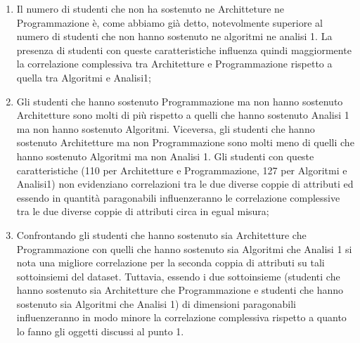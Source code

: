 \documentclass[12pt]{article}
\begin{document}
\begin{enumerate}
	\item Il numero di studenti che non ha sostenuto ne Architteture ne Program\-mazione è, come abbiamo già detto, notevolmente superiore al numero di studenti che non hanno sostenuto ne algoritmi ne analisi 1. La presenza di studenti con queste caratteristiche influenza quindi mag\-giormente la correlazione complessiva tra Architetture e Programma\-zione rispetto a quella tra Algoritmi e Analisi1; 
	\item Gli studenti che hanno sostenuto Programmazione ma non hanno sostenuto Architetture sono molti di più rispetto a quelli che hanno sostenuto Analisi 1 ma non hanno sostenuto Algoritmi. Viceversa, gli studenti che hanno sostenuto Architetture ma non Programmazione sono molti meno di quelli che hanno sostenuto Algoritmi ma non Analisi 1. Gli studenti con queste caratteristiche (110 per Architetture e Programma\-zione, 127 per Algoritmi e Analisi1) non evidenziano correlazioni tra le due diverse coppie di attributi ed essendo in quantità paragonabili influenzeranno le correlazione complessive tra le due diverse coppie di attributi circa in egual misura;
	\item Confrontando gli studenti che hanno sostenuto sia Architetture che Pro\-grammazione con quelli che hanno sostenuto sia Algoritmi che Analisi 1 si nota una migliore correlazione per la seconda coppia di attributi su tali sottoinsiemi del dataset. Tuttavia, essendo i due sottoinsieme (studenti che hanno sostenuto sia Architetture che Pro\-gramma\-zione e studenti che hanno sostenuto sia Algoritmi che Analisi 1) di dimensioni paragonabili influenzeranno in modo minore la corre\-lazione complessiva rispetto a quanto lo fanno gli oggetti discussi al punto 1.
\end{enumerate}
\end{document}
